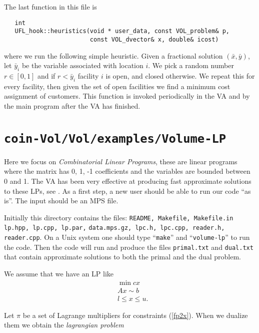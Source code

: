 \documentclass{article}
\begin{document}
The last function in this file is
\begin{verbatim}
   int 
   UFL_hook::heuristics(void * user_data, const VOL_problem& p,
                        const VOL_dvector& x, double& icost)
\end{verbatim}

\noindent where we run the following simple heuristic. 
Given a fractional solution $(\bar x, \bar y)$, let $\bar y_i$ be the variable
associated with location $i$. We pick a random number $r \in [ 0, 1 ]$ and if
$r < \bar y_i$ facility $i$ is open, and closed otherwise. We repeat this for
every facility, then given the set of open facilities we find a minimum cost
assignment of customers. This function is invoked periodically in the VA and
by the main program after the VA has finished.


\section{{\tt coin-Vol/Vol/examples/Volume-LP}}

Here we focus on {\it Combinatorial Linear Programs},
these are linear programs where the matrix has 0, 1, -1 coefficients
and the variables are bounded between 0 and 1. The VA has been very
effective at producing fast approximate solutions to these LPs, see
\cite{BA2}.
As a first step, a new user should be able to run our code ``as is''.
The input should be an MPS file.


Initially this directory contains the files: {\tt README, Makefile, Makefile.in
lp.hpp, lp.cpp, lp.par,} %
{\tt data.mps.gz, lpc.h, lpc.cpp,
reader.h, reader.cpp}. On a Unix system one
should type ``{\tt make}'' and ``{\tt volume-lp}''
to run the code. Then the code will run and produce the files {\tt primal.txt}
and {\tt dual.txt} that contain approximate solutions to both the primal
and the dual problem.

\smallskip

We assume that we have an LP like
\begin{eqnarray}
&\min c x  \label{fp1x} \\
&Ax \sim b \label{fp2x} \\
&l \leq x \le u. \label{fp3x} 
\end{eqnarray}

Let $\pi$ be a set of
Lagrange multipliers for constraints (\ref{fp2x}). When we dualize 
them we obtain the {\it lagrangian problem}
\end{document}
